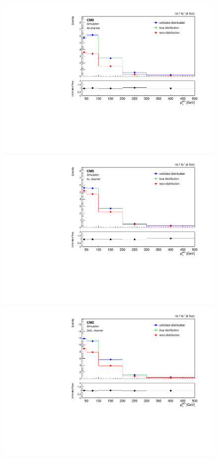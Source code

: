 \begin{figure}[hbtp]
\begin{center}
    \includegraphics[width=0.8\cmsFigWidth]{Figures/Unfolding/MCTests/PtJet1_ZZTo4e_MadMatrix_MadDistr_HalfSample_fr}     
    \includegraphics[width=0.8\cmsFigWidth]{Figures/Unfolding/MCTests/PtJet1_ZZTo4m_MadMatrix_MadDistr_HalfSample_fr}     
    \includegraphics[width=0.8\cmsFigWidth]{Figures/Unfolding/MCTests/PtJet1_ZZTo2e2m_MadMatrix_MadDistr_HalfSample_fr}     

\end{center}
\end{figure}
